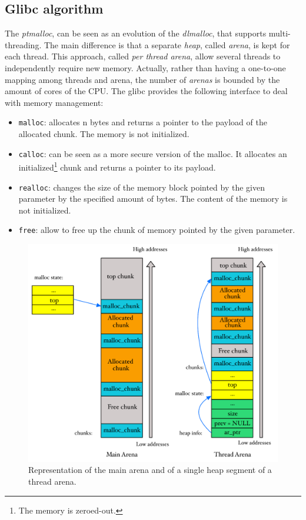 \documentclass{article}
\numberwithin{equation}{subsection}
\begin{document}
\subsection{Glibc algorithm}
The \emph{ptmalloc}, can be seen as an evolution of the \emph{dlmalloc}, that supports multi-threading. The main difference is that a separate \emph{heap}, called \emph{arena}, is kept for each thread. This approach, called \emph{per thread arena}, allow several threads to independently require new memory. Actually, rather than having a one-to-one mapping among threads and arena, the number of \emph{arenas} is bounded by the amount of cores of the CPU.
The glibc provides the following interface to deal with memory management:
\begin{itemize}
    \item \texttt{malloc}: allocates n bytes and returns a pointer to the payload of the allocated chunk. The memory is not initialized.
    \item \texttt{calloc}: can be seen as a more secure version of the malloc. It allocates an initialized\footnote{The memory is zeroed-out.} chunk and returns a pointer to its payload.
    \item \texttt{realloc}: changes the size of the memory block pointed by the given parameter by the specified amount of bytes. The content of the memory is not initialized.
    \item \texttt{free}: allow to free up the chunk of memory pointed by the given parameter.
\end{itemize}
\begin{figure}[H]
    \centering
    \includegraphics[width=\textwidth]{single_heap_segment.pdf}
    \caption{Representation of the main arena and of a single heap segment of a thread arena.}
    \label{fig:single_heap_segment}
\end{figure}
\end{document}
